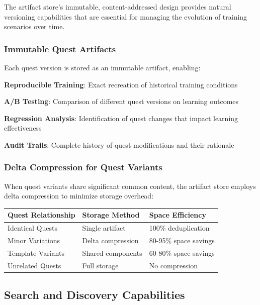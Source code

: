 The artifact store's immutable, content-addressed design provides natural versioning capabilities that are essential for managing the evolution of training scenarios over time.

\subsubsection*{Immutable Quest Artifacts}

Each quest version is stored as an immutable artifact, enabling:

\begin{compactlist}
    \item \textbf{Reproducible Training}: Exact recreation of historical training conditions
    \item \textbf{A/B Testing}: Comparison of different quest versions on learning outcomes
    \item \textbf{Regression Analysis}: Identification of quest changes that impact learning effectiveness
    \item \textbf{Audit Trails}: Complete history of quest modifications and their rationale
\end{compactlist}

\subsubsection*{Delta Compression for Quest Variants}

When quest variants share significant common content, the artifact store employs delta compression to minimize storage overhead:

\begin{center}
\begin{tabular}{@{}lll@{}}
\toprule
\textbf{Quest Relationship} & \textbf{Storage Method} & \textbf{Space Efficiency} \\
\midrule
Identical Quests & Single artifact & 100\% deduplication \\
Minor Variations & Delta compression & 80-95\% space savings \\
Template Variants & Shared components & 60-80\% space savings \\
Unrelated Quests & Full storage & No compression \\
\bottomrule
\end{tabular}
\end{center}

\subsection*{Search and Discovery Capabilities}

